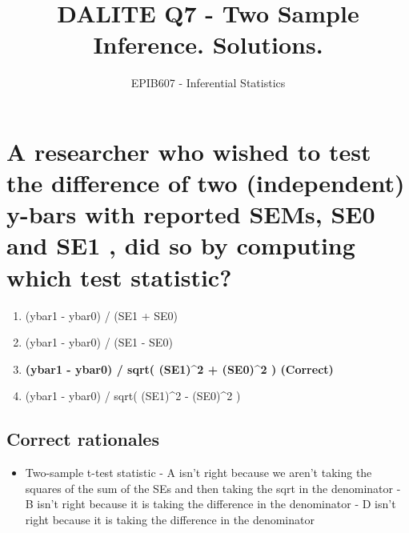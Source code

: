 \documentclass[letterpaper,9pt,twoside,printwatermark=false]{pinp}
\title{DALITE Q7 - Two Sample Inference. Solutions.}
\author[a]{EPIB607 - Inferential Statistics}
\affil[a]{Fall 2018, McGill University}
\providecommand{\tightlist}{%
  \setlength{\itemsep}{0pt}\setlength{\parskip}{0pt}}
\begin{document}
\verticaladjustment{-2pt}

\maketitle
\thispagestyle{firststyle}



\section{A researcher who wished to test the difference of two
(independent) y-bars with reported SEMs, SE0 and SE1 , did so by
computing which test
statistic?}\label{a-researcher-who-wished-to-test-the-difference-of-two-independent-y-bars-with-reported-sems-se0-and-se1-did-so-by-computing-which-test-statistic}

\begin{enumerate}
\def\labelenumi{\alph{enumi}.}
\tightlist
\item
  (ybar1 - ybar0) / (SE1 + SE0)
\item
  (ybar1 - ybar0) / (SE1 - SE0)
\item
  \textbf{(ybar1 - ybar0) / sqrt( (SE1)\^{}2 + (SE0)\^{}2 ) (Correct)}
\item
  (ybar1 - ybar0) / sqrt( (SE1)\^{}2 - (SE0)\^{}2 )
\end{enumerate}

\subsection{Correct rationales}\label{correct-rationales}

\begin{itemize}
\tightlist
\item
  Two-sample t-test statistic - A isn't right because we aren't taking
  the squares of the sum of the SEs and then taking the sqrt in the
  denominator - B isn't right because it is taking the difference in the
  denominator - D isn't right because it is taking the difference in the
  denominator
\end{itemize}
\end{document}
